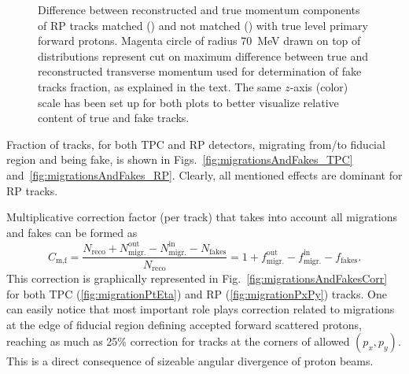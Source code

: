 \begin{figure}
{}%
\caption[Difference between reconstructed and true momentum components of RP tracks.]{Difference between reconstructed and true momentum components of RP tracks matched () and not matched () with true level primary forward protons. Magenta circle of radius 70~MeV drawn on top of distributions represent cut on maximum difference between true and reconstructed transverse momentum used for determination of fake tracks fraction, as explained in the text. The same $z$-axis (color) scale has been set up for both plots to better visualize relative content of true and fake tracks.} \label{fig:DeltaPyVsDeltaPx}
\end{figure}


Fraction of tracks, for both TPC and RP detectors, migrating from/to fiducial region and being fake, is shown in Figs.~\ref{fig:migrationsAndFakes_TPC} and~\ref{fig:migrationsAndFakes_RP}. Clearly, all mentioned effects are dominant for RP tracks.



Multiplicative correction factor (per track) that takes into account all migrations and fakes can be formed as
\begin{equation}
 C_{\text{m,f}} = \frac{N_{\textrm{reco}} + N_{\textrm{migr.}}^{\textrm{out}} - N_{\textrm{migr.}}^{\textrm{in}} - N_{\textrm{fakes}}}{N_{\textrm{reco}}} = 1 + f_{\text{migr.}}^{\text{out}} - f_{\text{migr.}}^{\text{in}} - f_{\text{fakes}}.
\end{equation}
This correction is graphically represented in Fig.~\ref{fig:migrationsAndFakesCorr} for both TPC (\ref{fig:migrationPtEta}) and RP (\ref{fig:migrationPxPy}) tracks. One can easily notice that most important role plays correction related to migrations at the edge of fiducial region defining accepted forward scattered protons, reaching as much as 25\% correction for tracks at the corners of allowed $(p_{x}, p_{y})$. This is a direct consequence of sizeable angular divergence of proton beams.




